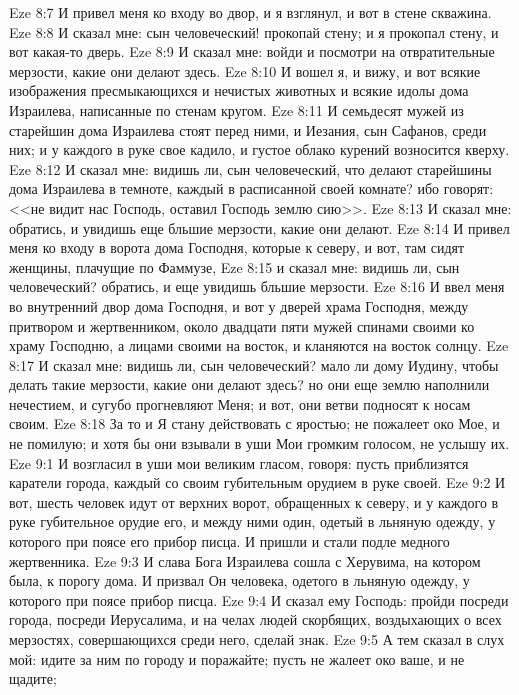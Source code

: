 \vs Eze 8:7 И привел меня ко входу во двор, и я взглянул, и вот в стене скважина.
\vs Eze 8:8 И сказал мне: сын человеческий! прокопай стену; и я прокопал стену, и вот какая-то дверь.
\vs Eze 8:9 И сказал мне: войди и посмотри на отвратительные мерзости, какие они делают здесь.
\vs Eze 8:10 И вошел я, и вижу, и вот всякие изображения пресмыкающихся и нечистых животных и всякие идолы дома Израилева, написанные по стенам кругом.
\vs Eze 8:11 И семьдесят мужей из старейшин дома Израилева стоят перед ними, и Иезания, сын Сафанов, среди них; и у каждого в руке свое кадило, и густое облако курений возносится кверху.
\vs Eze 8:12 И сказал мне: видишь ли, сын человеческий, что делают старейшины дома Израилева в темноте, каждый в расписанной своей комнате? ибо говорят: <<не видит нас Господь, оставил Господь землю сию>>.
\vs Eze 8:13 И сказал мне: обратись, и увидишь еще бльшие мерзости, какие они делают.
\vs Eze 8:14 И привел меня ко входу в ворота дома Господня, которые к северу, и вот, там сидят женщины, плачущие по Фаммузе,
\vs Eze 8:15 и сказал мне: видишь ли, сын человеческий? обратись, и еще увидишь бльшие мерзости.
\vs Eze 8:16 И ввел меня во внутренний двор дома Господня, и вот у дверей храма Господня, между притвором и жертвенником, около двадцати пяти мужей  спинами своими ко храму Господню, а лицами своими на восток, и кланяются на восток солнцу.
\vs Eze 8:17 И сказал мне: видишь ли, сын человеческий? мало ли дому Иудину, чтобы делать такие мерзости, какие они делают здесь? но они еще землю наполнили нечестием, и сугубо прогневляют Меня; и вот, они ветви подносят к носам своим.
\vs Eze 8:18 За то и Я стану действовать с яростью; не пожалеет око Мое, и не помилую; и хотя бы они взывали в уши Мои громким голосом, не услышу их.
\vs Eze 9:1 И возгласил в уши мои великим гласом, говоря: пусть приблизятся каратели города, каждый со своим губительным орудием в руке своей.
\vs Eze 9:2 И вот, шесть человек идут от верхних ворот, обращенных к северу, и у каждого в руке губительное орудие его, и между ними один, одетый в льняную одежду, у которого при поясе его прибор писца. И пришли и стали подле медного жертвенника.
\vs Eze 9:3 И слава Бога Израилева сошла с Херувима, на котором была, к порогу дома. И призвал Он человека, одетого в льняную одежду, у которого при поясе прибор писца.
\vs Eze 9:4 И сказал ему Господь: пройди посреди города, посреди Иерусалима, и на челах людей скорбящих, воздыхающих о всех мерзостях, совершающихся среди него, сделай знак.
\vs Eze 9:5 А тем сказал в слух мой: идите за ним по городу и поражайте; пусть не жалеет око ваше, и не щадите;
